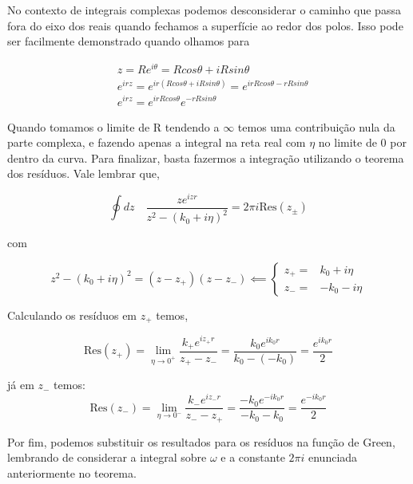 No contexto de integrais complexas podemos desconsiderar o caminho que passa fora do eixo dos reais quando fechamos a superfície ao redor dos polos. Isso pode ser facilmente demonstrado quando olhamos para

\begin{equation*}
	\begin{split}
	&z = Re^{i\theta} = Rcos\theta + iRsin\theta \\
	&e^{irz} = e^{ir(Rcos\theta + iRsin\theta)} = e^{irRcos\theta - rRsin\theta}\\
	&e^{irz} = e^{irRcos\theta}e^{-rRsin\theta}
	\end{split}
\end{equation*}

Quando tomamos o limite de R tendendo a $\infty$ temos uma contribuição nula da parte complexa, e fazendo apenas a integral na reta real com $\eta$ no limite de 0 por dentro da curva. Para finalizar, basta fazermos a integração utilizando o teorema dos resíduos. Vale lembrar que,

\begin{equation}
	\oint dz \quad \frac{ze^{izr}}{z^2-(k_0+i\eta)^2} = 2\pi i \text{Res}(z_\pm)
\end{equation}

com

\begin{equation}
	z^2-(k_0+i\eta)^2 = (z-z_+)(z-z_-) \impliedby \begin{cases} 
		z_+ =& k_0 + i\eta \\
		z_- =& -k_0 - i\eta 
	\end{cases}
\end{equation}

Calculando os resíduos em $z_+$ temos,

\begin{equation}
	\text{Res}(z_+) = \lim_{\eta\rightarrow 0^+} \frac{k_+ e^{iz_+r}}{z_+-z_-} = \frac{k_0 e^{ik_0r}}{k_0-(-k_0)} = \frac{e^{ik_0r}}{2}
\end{equation}

já em $z_-$ temos:
\begin{equation}
	\text{Res}(z_-) = \lim_{\eta\rightarrow 0^-} \frac{k_- e^{iz_-r}}{z_--z_+} = \frac{-k_0 e^{-ik_0r}}{-k_0-k_0} = \frac{e^{-ik_0r}}{2}
\end{equation}


Por fim, podemos substituir os resultados para os resíduos na função de Green, lembrando de considerar a integral sobre $\omega$ e a constante $2\pi i$ enunciada anteriormente no teorema.

